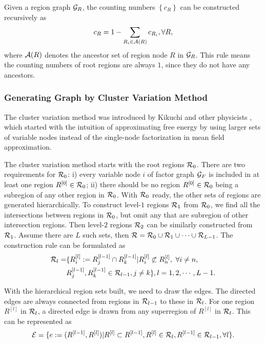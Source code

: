 Given a region graph $\mathcal{G}_R$, the counting numbers $\left\{ c_R \right\}$ can be constructed recursively as
\begin{equation}
  c_R = 1 - \sum_{R_i \in \mathcal{A}(R)} c_{R_i}, \forall R,
\end{equation}
where $\mathcal{A}(R)$ denotes the ancestor set of region node $R$ in $\mathcal{G}_R$. This rule means the counting numbers of root regions are always $1$, since they do not have any ancestors.


\subsubsection{Generating Graph by Cluster Variation Method}
\label{sec:cluster-variation-method}

The cluster variation method was introduced by Kikuchi and other physicists \cite{PhysRev.81.988,morita1991cluster}, which started with the intuition of approximating free energy by using larger sets of variable nodes instead of the single-node factorization in mean field approximation.

The cluster variation method starts with the root regions $\mathcal{R}_0$. There are two requirements for $\mathcal{R}_0$: i) every variable node $i$ of factor graph $\mathcal{G}_F$ is included in at least one region $R^{[0]}\in\mathcal{R}_0$; ii) there should be no region $R^{[0]}\in \mathcal{R}_0$ being a subregion of any other region in $\mathcal{R}_0$.
With $\mathcal{R}_0$ ready, the other sets of regions are generated hierarchically. To construct level-$1$ regions $\mathcal{R}_1$ from $\mathcal{R}_0$, we find all the intersections between regions in $\mathcal{R}_0$, but omit any that are subregion of other intersection regions. Then level-$2$ regions $\mathcal{R}_2$ can be similarly constructed from $\mathcal{R}_1$. Assume there are $L$ such sets, then $\mathcal{R} = \mathcal{R}_0 \cup \mathcal{R}_1 \cup \cdots \cup \mathcal{R}_{L-1}$. The construction rule can be formulated as
\begin{align}
  \mathcal{R}_l = &\{ R^{[l]}_i := R^{[l-1]}_j \cap R^{[l-1]}_k | R^{[l]}_i \not\subset R^{[l]}_n,~ \forall i \neq n, \nonumber \\
          &R^{[l-1]}_j, R^{[l-1]}_k \in \mathcal{R}_{l-1} , j\neq k\}, l=1, 2, \cdots, L-1.
\end{align}

With the hierarchical region sets built, we need to draw the edges. The directed edges are always connected from regions in $\mathcal{R}_{l-1}$ to these in $\mathcal{R}_{l}$. For one region $R^{[l]}$ in $\mathcal{R}_l$, a directed edge is drawn from any superregion of $R^{[l]}$ in $\mathcal{R}_l$. This can be represented as
\begin{align}
  \mathcal{E} = \{ e := (R^{[l-1]}, R^{[l]}) | R^{[l]} \subset R^{[l-1]}, R^{[l]} \in \mathcal{R}_l, R^{[l-1]} \in \mathcal{R}_{l-1} , \forall l\}.
\end{align}



